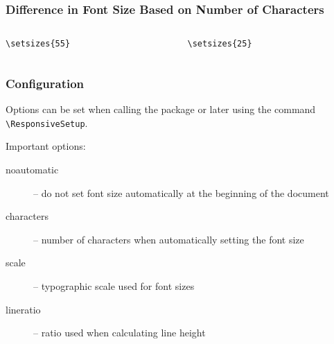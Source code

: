 \begin{frame}[fragile]
  \frametitle{Difference in Font Size Based on Number of Characters}
\begin{columns}
  \begin{column}{0.5\textwidth}
\begin{verbatim}
\setsizes{55}
\end{verbatim}
\end{column}
\begin{column}{0.5\textwidth}
\begin{verbatim}
\setsizes{25}
\end{verbatim}
\end{column}
\end{columns}
\end{frame}

\begin{frame}[fragile]
  \frametitle{Configuration}
  Options can be set when calling the package or later using the command \verb|\ResponsiveSetup|.

  Important options:

  \begin{description}
    \item[noautomatic] -- do not set font size automatically at the beginning of the document
    \item[characters] -- number of characters when automatically setting the font size
    \item[scale] -- typographic scale used for font sizes
    \item[lineratio] -- ratio used when calculating line height
  \end{description}

\end{frame}

